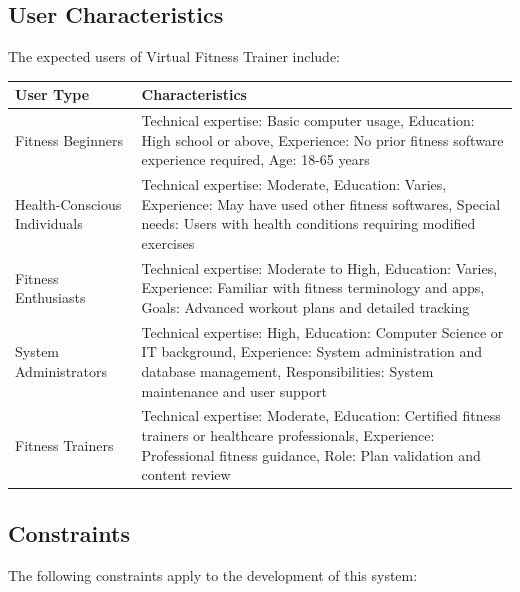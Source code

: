 \documentclass[12pt,a4paper]{article}
\begin{document}
\subsection{User Characteristics}
The expected users of Virtual Fitness Trainer include:

\begin{table}[h]
\centering
\begin{tabular}{|p{3.5cm}|p{9.5cm}|}
\hline
\textbf{User Type} & \textbf{Characteristics} \\
\hline
Fitness Beginners & Technical expertise: Basic computer usage, Education: High school or above, Experience: No prior fitness software experience required, Age: 18-65 years \\
\hline
Health-Conscious Individuals & Technical expertise: Moderate, Education: Varies, Experience: May have used other fitness softwares, Special needs: Users with health conditions requiring modified exercises \\
\hline
Fitness Enthusiasts & Technical expertise: Moderate to High, Education: Varies, Experience: Familiar with fitness terminology and apps, Goals: Advanced workout plans and detailed tracking \\
\hline
System Administrators & Technical expertise: High, Education: Computer Science or IT background, Experience: System administration and database management, Responsibilities: System maintenance and user support \\
\hline
Fitness Trainers & Technical expertise: Moderate, Education: Certified fitness trainers or healthcare professionals, Experience: Professional fitness guidance, Role: Plan validation and content review \\
\hline
\end{tabular}
\end{table}

\subsection{Constraints}
The following constraints apply to the development of this system:
\end{document}
